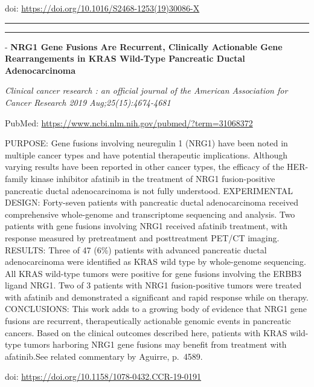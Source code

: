 \documentclass[]{article}
\begin{document}
doi: \url{https://doi.org/10.1016/S2468-1253(19)30086-X}

{}

{}

\begin{center}\rule{0.5\linewidth}{\linethickness}\end{center}

\begin{center}\rule{0.5\linewidth}{\linethickness}\end{center}

 - \textbf{NRG1 Gene Fusions Are Recurrent, Clinically Actionable Gene
Rearrangements in KRAS Wild-Type Pancreatic Ductal Adenocarcinoma}

\emph{Clinical cancer research : an official journal of the American
Association for Cancer Research 2019 Aug;25(15):4674-4681}

PubMed: \url{https://www.ncbi.nlm.nih.gov/pubmed/?term=31068372}

PURPOSE: Gene fusions involving neuregulin 1 (NRG1) have been noted in
multiple cancer types and have potential therapeutic implications.
Although varying results have been reported in other cancer types, the
efficacy of the HER-family kinase inhibitor afatinib in the treatment of
NRG1 fusion-positive pancreatic ductal adenocarcinoma is not fully
understood. EXPERIMENTAL DESIGN: Forty-seven patients with pancreatic
ductal adenocarcinoma received comprehensive whole-genome and
transcriptome sequencing and analysis. Two patients with gene fusions
involving NRG1 received afatinib treatment, with response measured by
pretreatment and posttreatment PET/CT imaging. RESULTS: Three of 47
(6\%) patients with advanced pancreatic ductal adenocarcinoma were
identified as KRAS wild type by whole-genome sequencing. All KRAS
wild-type tumors were positive for gene fusions involving the ERBB3
ligand NRG1. Two of 3 patients with NRG1 fusion-positive tumors were
treated with afatinib and demonstrated a significant and rapid response
while on therapy. CONCLUSIONS: This work adds to a growing body of
evidence that NRG1 gene fusions are recurrent, therapeutically
actionable genomic events in pancreatic cancers. Based on the clinical
outcomes described here, patients with KRAS wild-type tumors harboring
NRG1 gene fusions may benefit from treatment with afatinib.See related
commentary by Aguirre, p.~4589.

doi: \url{https://doi.org/10.1158/1078-0432.CCR-19-0191}

{}

{}
\end{document}
